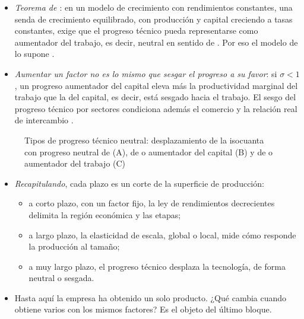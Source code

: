 \documentclass[11pt]{article}
\begin{document}
\begin{itemize}
  \begin{equation}
  A_t\,z_K^{\alpha}z_L^{\beta}=\big(A_t^{1/\alpha}z_K\big)^{\alpha}z_L^{\beta}=z_K^{\alpha}\big(A_t^{1/\beta}z_L\big)^{\beta}. \label{eq:neutralidad-cobb-douglas}
  \end{equation}
\item \emph{Teorema de \textcite{Uzawa1961Neutral}}: en un modelo de crecimiento con rendimientos constantes, una senda de crecimiento equilibrado, con producción y capital creciendo a tasas constantes, exige que el progreso técnico pueda representarse como aumentador del trabajo, es decir, neutral en sentido de \nocite{Acemoglu2009Introduction}. Por eso el modelo de  lo supone .
\item \emph{Aumentar un factor no es lo mismo que sesgar el progreso a su favor}: si $\sigma<1$, un progreso aumentador del capital eleva más la productividad marginal del trabajo que la del capital, es decir, está sesgado hacia el trabajo\nocite{Acemoglu2009Introduction}. El sesgo del progreso técnico por sectores condiciona además el comercio y la relación real de intercambio .
\end{itemize}

\begin{figure}[H]
\centering
\caption{Tipos de progreso técnico neutral: desplazamiento de la isocuanta con progreso neutral de  (A), de  o aumentador del capital (B) y de  o aumentador del trabajo (C)}\label{fig:progreso-tecnico-neutral}
\end{figure}

\begin{itemize}
\item \emph{Recapitulando}, cada plazo es un corte de la superficie de producción:
  \begin{itemize}
  \item a corto plazo, con un factor fijo, la ley de rendimientos decrecientes delimita la región económica y las etapas;
  \item a largo plazo, la elasticidad de escala, global o local, mide cómo responde la producción al tamaño;
  \item a muy largo plazo, el progreso técnico desplaza la tecnología, de forma neutral o sesgada.
  \end{itemize}
\item Hasta aquí la empresa ha obtenido un solo producto. ¿Qué cambia cuando obtiene varios con los mismos factores? Es el objeto del último bloque.
\end{itemize}
\end{document}
